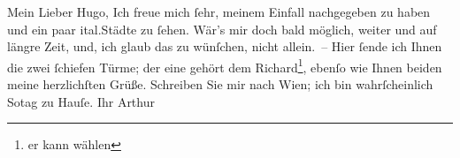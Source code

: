 \pstart{}Mein Lieber Hugo,\pend\vspace{0.5em}
\pstart
           Ich freue mich{ }ſehr, meinem Einfall nachgegeben zu haben und ein paar ital.Städte zu{ }ſehen. Wär’s mir doch bald möglich,
               weiter und auf längre Zeit, und, ich glaub das zu wünſchen, nicht allein. – Hier{ }ſende ich Ihnen die zwei{ }ſchiefen Türme; der
               eine gehört dem Richard\footnote{\noindent{}er kann wählen}, ebenſo wie Ihnen beiden meine herzlichſten Grüße. Schreiben Sie mir nach Wien; ich bin wahrſcheinlich So{\geminationn}tag zu Hauſe.\pend
           \pstart Ihr \spacefill\mbox{Arthur}\pend{}
\pstart
           \noindent{}\label{T_L00842-1v}\label{T_L00842-1}\pend
           \endnumbering{}  \newcommand{\dateiname}{L00842}\newcommand{\titel}{Arthur Schnitzler an Hugo von Hofmannsthal, 31. 8. 1898}\newcommand{\editorInnen}{Martin Anton Müller und Gerd-Hermann Susen}
